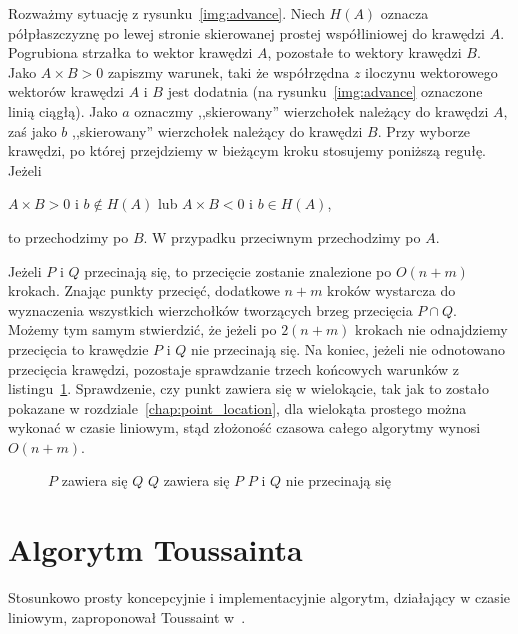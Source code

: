 Rozważmy sytuację z rysunku~\ref{img:advance}. Niech $H(A)$ oznacza
półpłaszczyznę po lewej stronie skierowanej prostej współliniowej do
krawędzi $A$. Pogrubiona strzałka to wektor krawędzi $A$, pozostałe to
wektory krawędzi $B$.  Jako $A \times B > 0$ zapiszmy warunek, taki że
współrzędna $z$ iloczynu wektorowego wektorów krawędzi $A$ i $B$ jest
dodatnia (na rysunku~\ref{img:advance} oznaczone linią ciągłą). Jako
$a$ oznaczmy ,,skierowany'' wierzchołek należący do krawędzi $A$, zaś
jako $b$ ,,skierowany'' wierzchołek należący do krawędzi $B$. Przy
wyborze krawędzi, po której przejdziemy w bieżącym kroku stosujemy
poniższą regułę. Jeżeli

\begin{center}
  $A \times B > 0 $ i $b \notin H(A)$ lub $A \times B < 0 $ i $b \in
  H(A)$,
\end{center}

to przechodzimy po $B$. W przypadku przeciwnym przechodzimy po $A$.

Jeżeli $P$ i $Q$ przecinają się, to przecięcie zostanie znalezione po
$O(n+m)$ krokach. Znając punkty przecięć, dodatkowe $n+m$ kroków
wystarcza do wyznaczenia wszystkich wierzchołków tworzących brzeg
przecięcia $P \cap Q$. Możemy tym samym stwierdzić, że jeżeli po
$2(n+m)$ krokach nie odnajdziemy przecięcia to krawędzie $P$ i $Q$ nie
przecinają się. Na koniec, jeżeli nie odnotowano przecięcia krawędzi,
pozostaje sprawdzanie trzech końcowych warunków z
listingu~\ref{alg:OrourkeFinalTerms}. Sprawdzenie, czy punkt zawiera
się w wielokącie, tak jak to zostało pokazane w
rozdziale~\ref{chap:point_location}, dla wielokąta prostego można
wykonać w czasie liniowym, stąd złożoność czasowa całego algorytmy
wynosi $O(n + m)$.

\begin{figure}
  \begin{algorithmic}[1]
    \State $P$ zawiera się $Q$
    \Else
    \State $Q$ zawiera się $P$
    \Else
    \State $P$ i $Q$ nie przecinają się
    \EndIf
    \EndIf
  \end{algorithmic}
  \caption{\label{alg:OrourkeFinalTerms}}
\end{figure}

\section{Algorytm Toussainta}
Stosunkowo prosty koncepcyjnie i implementacyjnie algorytm, działający
w czasie liniowym, zaproponował Toussaint w~\cite{ToussaintInt}.

